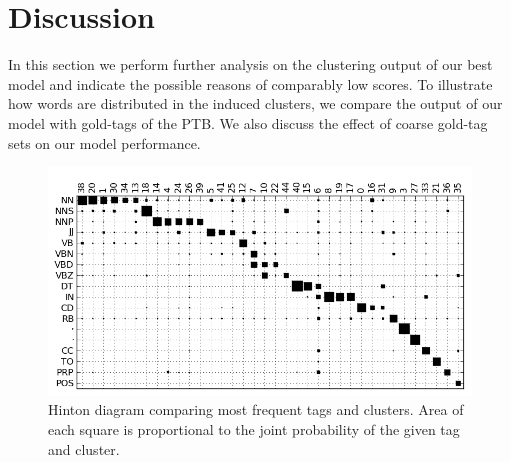 \section{Discussion}
\label{sec:discuss}

In this section we perform further analysis on the clustering output
of our best model and indicate the possible reasons of comparably low
\vm scores.  To illustrate how words are distributed in the induced
clusters, we compare the output of our model with gold-tags of the
PTB.  We also discuss the effect of coarse gold-tag sets on our model
performance.
\begin{figure}[ht] \centering
\includegraphics[width=\textwidth]{hinton.png}
\caption{Hinton diagram comparing most frequent tags and clusters.
  Area of each square is proportional to the joint probability of the
  given tag and cluster.}
\label{plot-hinton}
\end{figure}

